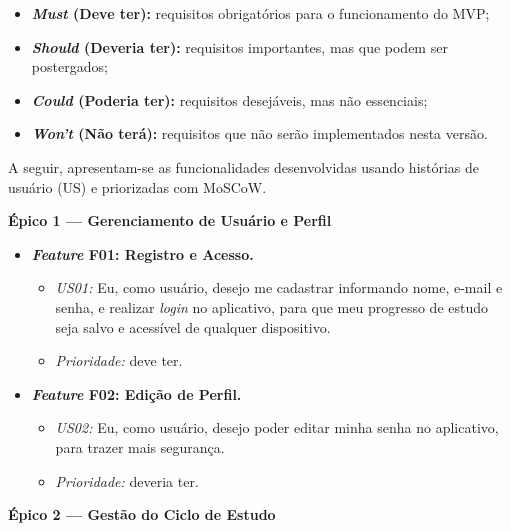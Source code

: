 \begin{itemize}
    \item \textbf{\textit{Must} (Deve ter):} requisitos obrigatórios para o funcionamento do MVP;
    \item \textbf{\textit{Should} (Deveria ter):} requisitos importantes, mas que podem ser postergados;
    \item \textbf{\textit{Could} (Poderia ter):} requisitos desejáveis, mas não essenciais;
    \item \textbf{\textit{Won't} (Não terá):} requisitos que não serão implementados nesta versão.
\end{itemize}

A seguir, apresentam-se as funcionalidades desenvolvidas usando histórias de usuário (US) e priorizadas com MoSCoW.

\textbf{Épico 1 --- Gerenciamento de Usuário e Perfil}

\begin{itemize}
    \item \textbf{\textit{Feature} F01: Registro e Acesso.}
    \begin{itemize}
        \item \textit{US01:} Eu, como usuário, desejo me cadastrar informando nome, e-mail e senha, e realizar \textit{login} no aplicativo, para que meu progresso de estudo seja salvo e acessível de qualquer dispositivo.
        \item \textit{Prioridade:} deve ter.
    \end{itemize}
    \item \textbf{\textit{Feature} F02: Edição de Perfil.}
    \begin{itemize}
        \item \textit{US02:} Eu, como usuário, desejo poder editar minha senha no aplicativo, para trazer mais segurança.
        \item \textit{Prioridade:} deveria ter.
    \end{itemize}
\end{itemize}

\textbf{Épico 2 --- Gestão do Ciclo de Estudo}

